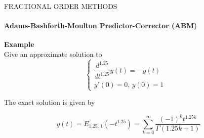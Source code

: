 \begin{frame}{FRACTIONAL ORDER METHODS}
\framesubtitle{Adams-Bashforth-Moulton Predictor-Corrector (ABM)}
\textbf{Example}\\\vspace{0.5cm}
Give an approximate solution to
\begin{equation}
    \begin{cases}
        \dfrac{d^{1.25}}{dt^{1.25}}y(t)=-y(t)&\\
        y'(0)=0,\,y(0)=1
    \end{cases}
\end{equation}

\begin{multicols}{2}
\null \vfill
The exact solution is given by

\begin{equation}
    y(t) = E_{1.25,\,1}(-t^{1.25})=\sum_{k=0}^{\infty}\dfrac{(-1)^kt^{1.25k}}{\Gamma(1.25k +1)}
\end{equation}
\null \vfill
\columnbreak
\begin{figure}[H]
        \centering

\end{figure}
\end{multicols}
\end{frame}
